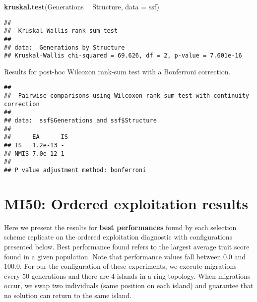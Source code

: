 \documentclass[]{book}
\newenvironment{Shaded}{\begin{snugshade}}{\end{snugshade}}
\newcommand{\DataTypeTok}[1]{\textcolor[rgb]{0.13,0.29,0.53}{#1}}
\newcommand{\KeywordTok}[1]{\textcolor[rgb]{0.13,0.29,0.53}{\textbf{#1}}}
\newcommand{\NormalTok}[1]{#1}
\newcommand{\OperatorTok}[1]{\textcolor[rgb]{0.81,0.36,0.00}{\textbf{#1}}}
\newcommand{\OtherTok}[1]{\textcolor[rgb]{0.56,0.35,0.01}{#1}}
\newcommand{\StringTok}[1]{\textcolor[rgb]{0.31,0.60,0.02}{#1}}
\begin{document}
\begin{Shaded}
\begin{Highlighting}[]
\KeywordTok{kruskal.test}\NormalTok{(Generations }\OperatorTok{~}\StringTok{ }\NormalTok{Structure, }\DataTypeTok{data =}\NormalTok{ ssf)}
\end{Highlighting}
\end{Shaded}

\begin{verbatim}
## 
##  Kruskal-Wallis rank sum test
## 
## data:  Generations by Structure
## Kruskal-Wallis chi-squared = 69.626, df = 2, p-value = 7.601e-16
\end{verbatim}

Results for post-hoc Wilcoxon rank-sum test with a Bonferroni correction.

\begin{Shaded}
\end{Shaded}

\begin{verbatim}
## 
##  Pairwise comparisons using Wilcoxon rank sum test with continuity correction 
## 
## data:  ssf$Generations and ssf$Structure 
## 
##      EA      IS
## IS   1.2e-13 - 
## NMIS 7.0e-12 1 
## 
## P value adjustment method: bonferroni
\end{verbatim}

\hypertarget{mi50-ordered-exploitation-results}{%
\chapter{MI50: Ordered exploitation results}\label{mi50-ordered-exploitation-results}}

Here we present the results for \textbf{best performances} found by each selection scheme replicate on the ordered exploitation diagnostic with configurations presented below.
Best performance found refers to the largest average trait score found in a given population.
Note that performance values fall between 0.0 and 100.0.
For our the configuration of these experiments, we execute migrations every 50 generations and there are 4 islands in a ring topology.
When migrations occur, we swap two individuals (same position on each island) and guarantee that no solution can return to the same island.
\end{document}
